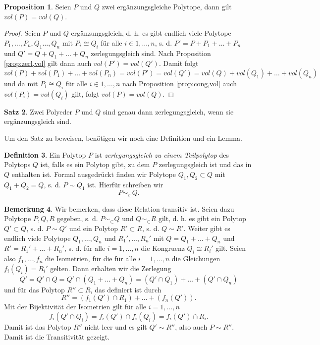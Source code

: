 \documentclass[11pt,titlepage]{article}
\theoremstyle{definition}
\newtheorem{theorem}{Satz}[section]
\newtheorem{proposition}[theorem]{Proposition}
\newtheorem{definition}[theorem]{Definition}
\newtheorem{remark}[theorem]{Bemerkung}
\theoremstyle{remark}
\begin{document}
	\begin{proposition}\label{coroll:ergvol}
		Seien $P$ und $Q$ zwei ergänzungsgleiche Polytope, dann gilt $vol(P)=vol(Q)$.
	\end{proposition}
	
	\begin{proof}
		Seien $P$ und $Q$ ergänzungsgleich, d. h. es gibt endlich viele Polytope $P_1,\ldots,P_n,
		Q_1\ldots,Q_n$ mit $P_i\cong Q_i$ für alle $i\in{1,\ldots,n}$, s. d. 
		$P'=P+P_1+\ldots+P_n$ und $Q'=Q+Q_1+\ldots+Q_n$ zerlegungsgleich sind. Nach 
		Proposition \ref{prop:zerl,vol} gilt dann auch $vol(P')=vol(Q')$. Damit folgt
		\[vol(P)+vol(P_1)+\ldots+vol(P_n)=vol(P')=vol(Q')=vol(Q)+vol(Q_1)+\ldots+vol(Q_n)\]
		und da mit $P_i\cong Q_i$ für alle $i\in{1,\ldots,n}$ nach Proposition \ref{prop:cong,vol} 
		auch $vol(P_i)=vol(Q_i)$ gilt, folgt $vol(P)=vol(Q)$.
	\end{proof}
	
	\begin{theorem} \label{thm:zerlerg}
		Zwei Polyeder $P$ und $Q$ sind genau dann zerlegungsgleich, wenn 
		sie ergänzungsgleich sind.
	\end{theorem}
	
	Um den Satz zu beweisen, benötigen wir noch eine Definition und ein Lemma.
	
	\begin{definition}
		Ein Polytop $P$ ist \textsl{zerlegungsgleich zu einem Teilpolytop} 
		des Polytops $Q$ ist, falls es ein Polytop gibt, zu dem 
		$P$ zerlegungsgleich ist und das in $Q$ enthalten ist. Formal 
		ausgedrückt finden wir Polytope $Q_1,Q_2\subset Q$ mit 
		$Q_1+Q_2=Q$, s. d. $P\sim Q_1$ ist. Hierfür schreiben wir 
		\[P\sim_{\subset} Q.\]
	\end{definition}
	
	\begin{remark}
		Wir bemerken, dass diese Relation transitiv ist. Seien 
		dazu Polytope $P,Q,R$ gegeben, s. d. $P\sim_{\subset}Q$ und $Q\sim_{\subset}R$ 
		gilt, d. h. es gibt ein Polytop $Q'\subset Q$, s. d. $P\sim Q'$ und ein Polytop 
		$R'\subset R$, s. d. $Q\sim R'$. Weiter gibt es endlich viele Polytope 
		$Q_1,\ldots,Q_n$ und $R_1',\ldots,R_n'$ mit $Q=Q_1+\ldots+Q_n$ und 
		$R'=R_1'+\ldots +R_n'$, s. d. für alle $i=1,\ldots,n$ die 
		Kongruenz $Q_i\cong R_i'$ gilt. 
		Seien also $f_1,\ldots,f_n$ die Isometrien, für die für 
		alle $i=1,\ldots,n$ die Gleichungen $f_i(Q_i)=R_i'$ gelten. Dann erhalten wir 
		die Zerlegung
		\[Q'=Q'\cap Q=Q'\cap(Q_1+\ldots+Q_n)=(Q'\cap Q_1)+\ldots+(Q'\cap Q_n)\]
		und für das Polytop $R''\subset R$, das definiert ist durch 
		\[R''=(f_1(Q')\cap R_1)+\ldots+(f_n(Q')).\]
		Mit der Bijektivität der Isometrien gilt für alle $i=1,\ldots,n$
		\[f_i(Q'\cap Q_i)=f_i(Q')\cap f_i(Q_i)=f_i(Q')\cap R_i.\]
		Damit ist das Polytop $R''$ nicht leer und es gilt $Q'\sim R''$, also auch 
		$P\sim R''$. Damit ist die Transitivität gezeigt.
	\end{remark}
	
\end{document}

